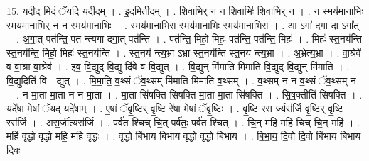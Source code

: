 \documentclass[17pt]{extarticle}
\begin{document}
15. यदी॒द मि॒दं ॅयदि॒ यदी॒दम् । . इ॒दमिती॒दम् । . शि॒वाभि॒र् न न शि॒वाभिः॑ शि॒वाभि॒र् न । . न स्मय॑मानाभिः॒ स्मय॑मानाभि॒र् न न स्मय॑मानाभिः । . स्मय॑मानाभि॒रा स्मय॑मानाभिः॒ स्मय॑मानाभि॒रा । . आ ऽगा॑ दगा॒ दा ऽगा᳚त् । . अ॒गा॒त् पत॑न्ति॒ पत॑ न्त्यगा दगा॒त् पत॑न्ति । . पत॑न्ति॒ मिहो॒ मिहः॒ पत॑न्ति॒ पत॑न्ति॒ मिहः॑ । . मिहः॑ स्त॒नय॑न्ति स्त॒नय॑न्ति॒ मिहो॒ मिहः॑ स्त॒नय॑न्ति । . स्त॒नय॑ न्त्य॒भ्रा ऽभ्रा स्त॒नय॑न्ति स्त॒नय॑ न्त्य॒भ्रा । . अ॒भ्रेत्य॒भ्रा । . वा॒श्रेवे॑ व वा॒श्रा वा॒श्रेव॑ । . इ॒व॒ वि॒द्युद् वि॒द्यु दि॑वे व वि॒द्युत् । . वि॒द्युन् मि॑माति मिमाति वि॒द्युद् वि॒द्युन् मि॑माति । . वि॒द्युदिति॑ वि - द्युत् । . मि॒मा॒ति॒ व॒थ्सं ॅव॒थ्सम् मि॑माति मिमाति व॒थ्सम् । . व॒थ्सम् न न व॒थ्सं ॅव॒थ्सम् न । . न मा॒ता मा॒ता न न मा॒ता । . मा॒ता सि॑षक्ति सिषक्ति मा॒ता मा॒ता सि॑षक्ति । . सि॒ष॒क्तीति॑ सिषक्ति । . यदे॑षा मेषां॒ ॅयद् यदे॑षाम् । . ए॒षां॒ ॅवृ॒ष्टिर् वृ॒ष्टि रे॑षा मेषां ॅवृ॒ष्टिः । . वृ॒ष्टि रस॒ र्ज्यस॑र्जि वृ॒ष्टिर् वृ॒ष्टि रस॑र्जि । . अस॒र्जीत्यस॑र्जि । . पर्व॑त श्चिच् चि॒त् पर्व॑तः॒ पर्व॑त श्चित् । . चि॒न् महि॒ महि॑ चिच् चि॒न् महि॑ । . महि॑ वृ॒द्धो वृ॒द्धो महि॒ महि॑ वृ॒द्धः । . वृ॒द्धो बि॑भाय बिभाय वृ॒द्धो वृ॒द्धो बि॑भाय । . बि॒भा॒य॒ दि॒वो दि॒वो बि॑भाय बिभाय दि॒वः । \newline
\end{document}
